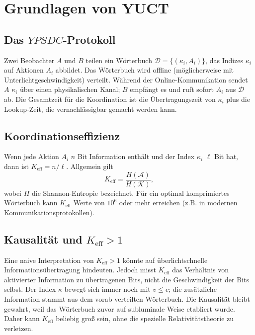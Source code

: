 \documentclass[12pt,a4paper]{article}
\newcommand{\Keff}{K_{\mathrm{eff}}}
\newcommand{\YPSDC}{YPSDC}
\begin{document}
	\section{Grundlagen von YUCT}
	\label{sec:foundations}
	
	\subsection{Das \(\YPSDC\)-Protokoll}
	\label{subsec:ypsdc}
	
	Zwei Beobachter \(A\) und \(B\) teilen ein Wörterbuch \(\mathcal{D} = \{ (\kappa_i, A_i) \}\), das Indizes \(\kappa_i\) auf Aktionen \(A_i\) abbildet. Das Wörterbuch wird offline (möglicherweise mit Unterlichtgeschwindigkeit) verteilt. Während der Online-Kommunikation sendet \(A\) \(\kappa_i\) über einen physikalischen Kanal; \(B\) empfängt es und ruft sofort \(A_i\) aus \(\mathcal{D}\) ab. Die Gesamtzeit für die Koordination ist die Übertragungszeit von \(\kappa_i\) plus die Lookup-Zeit, die vernachlässigbar gemacht werden kann.
	
	\subsection{Koordinationseffizienz}
	\label{subsec:keff}
	
	Wenn jede Aktion \(A_i\) \(n\) Bit Information enthält und der Index \(\kappa_i\) \(\ell\) Bit hat, dann ist \(\Keff = n/\ell\). Allgemein gilt
	\begin{equation}
		\Keff = \frac{H(\mathcal{A})}{H(\mathcal{K})},
	\end{equation}
	wobei \(H\) die Shannon-Entropie bezeichnet. Für ein optimal komprimiertes Wörterbuch kann \(\Keff\) Werte von \(10^6\) oder mehr erreichen (z.B. in modernen Kommunikationsprotokollen).
	
	\subsection{Kausalität und \(K_{\mathrm{eff}} > 1\)}
	\label{subsec:causality}
	
	Eine naive Interpretation von \(\Keff > 1\) könnte auf überlichtschnelle Informationsübertragung hindeuten. Jedoch misst \(\Keff\) das Verhältnis von aktivierter Information zu übertragenen Bits, nicht die Geschwindigkeit der Bits selbst. Der Index \(\kappa\) bewegt sich immer noch mit \(v \le c\); die zusätzliche Information stammt aus dem vorab verteilten Wörterbuch. Die Kausalität bleibt gewahrt, weil das Wörterbuch zuvor auf subluminale Weise etabliert wurde. Daher kann \(\Keff\) beliebig groß sein, ohne die spezielle Relativitätstheorie zu verletzen.
	
\end{document}
